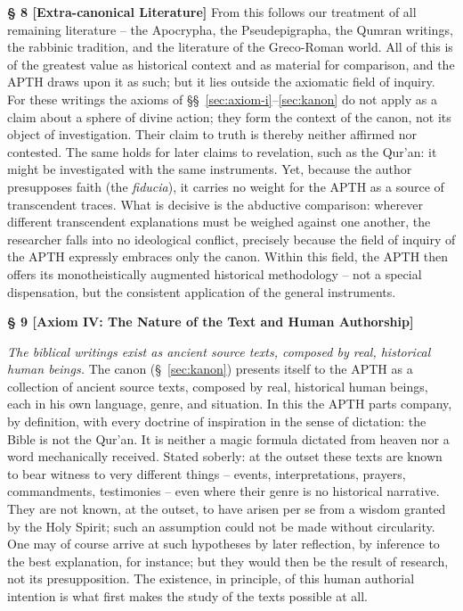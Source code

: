 \documentclass[11pt,a4paper]{article}
\makeatletter
\newcommand{\apth}{{\apthfont APTH}\hspace{0.15em}\xspace}
\newcommand{\apthsec}[3]{%
  \phantomsection%
  \def\@currentlabel{#1}%
  \label{sec:#3}%
  \textbf{§ #1 [#2]}%
}
\makeatother
\begin{document}
\apthsec{8}{Extra-canonical Literature}{ausserkanonisch} From this follows our treatment of all remaining literature -- the Apocrypha, the Pseudepigrapha, the Qumran writings, the rabbinic tradition, and the literature of the Greco-Roman world. All of this is of the greatest value as historical context and as material for comparison, and the \apth draws upon it as such; but it lies outside the axiomatic field of inquiry. For these writings the axioms of §§~\ref{sec:axiom-i}--\ref{sec:kanon} do not apply as a claim about a sphere of divine action; they form the context of the canon, not its object of investigation. Their claim to truth is thereby neither affirmed nor contested. The same holds for later claims to revelation, such as the Qur'an: it might be investigated with the same instruments. Yet, because the author presupposes faith (the \textit{fiducia}), it carries no weight for the \apth as a source of transcendent traces. What is decisive is the abductive comparison: wherever different transcendent explanations must be weighed against one another, the researcher falls into no ideological conflict, precisely because the field of inquiry of the \apth expressly embraces only the canon. Within this field, the \apth then offers its monotheistically augmented historical methodology -- not a special dispensation, but the consistent application of the general instruments.

\apthsec{9}{Axiom IV: The Nature of the Text and Human Authorship}{textnatur}
\textit{The biblical writings exist as ancient source texts, composed by real, historical human beings.}
The canon (§~\ref{sec:kanon}) presents itself to the \apth as a collection of ancient source texts, composed by real, historical human beings, each in his own language, genre, and situation. In this the \apth parts company, by definition, with every doctrine of inspiration in the sense of dictation: the Bible is not the Qur'an. It is neither a magic formula dictated from heaven nor a word mechanically received. Stated soberly: at the outset these texts are known to bear witness to very different things -- events, interpretations, prayers, commandments, testimonies -- even where their genre is no historical narrative. They are not known, at the outset, to have arisen per se from a wisdom granted by the Holy Spirit; such an assumption could not be made without circularity. One may of course arrive at such hypotheses by later reflection, by inference to the best explanation, for instance; but they would then be the result of research, not its presupposition. The existence, in principle, of this human authorial intention is what first makes the study of the texts possible at all.
\end{document}
